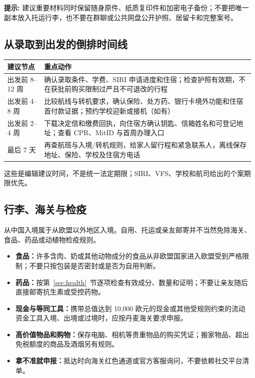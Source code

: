 \begin{grayleftbox}\textbf{提示: }
建议重要材料同时保留随身原件、纸质复印件和加密电子备份；不要把唯一副本放入托运行李，也不要在群聊或公共网盘公开护照、居留卡和完整案号。
\end{grayleftbox}

\subsection{从录取到出发的倒排时间线}

\noindent\begin{tabularx}{\textwidth}{@{}p{}X@{}}
\toprule
\textbf{建议节点} & \textbf{重点动作} \\
\midrule
出发前 8--12 周 & 确认录取条件、学费、SIRI 申请进度和住宿；检查护照有效期，不在获批前购买限制过严且不可退改的行程 \\
出发前 4--8 周 & 比较航线与转机要求，确认保险、处方药、银行卡境外功能和住宿首付款证据；预约学校迎新或接机（如有） \\
出发前 2--4 周 & 下载决定信和缴费回执，向住宿方确认钥匙、信箱姓名和可登记地址；查看 CPR、MitID 与首周办理入口 \\
最后 7 天 & 再查航班与入境/转机规则，给家人留行程和紧急联系人，离线保存地址、保险、学校及住宿方电话 \\
\bottomrule
\end{tabularx}

这些是编辑建议时间，不是统一法定期限；SIRI、VFS、学校和航司给出的个案期限优先。

\subsection{行李、海关与检疫}

从中国入境属于从欧盟以外地区入境。自用、托运或亲友邮寄并不当然免除海关、食品、药品或动植物检疫规则。

\begin{itemize}[leftmargin=2em,itemsep=3pt]
  \item \textbf{食品：}许多含肉、奶或其他动物成分的食品从非欧盟国家进入欧盟受到严格限制；不要只按包装是否密封或是否为自用判断。
  \item \textbf{药品：}按第~\ref{sec:health}~节逐项检查有效成分、数量和证明；不要让亲友随后直接邮寄抗生素或受控药物。
  \item \textbf{现金与等同工具：}携带总值达到 10,000 欧元的现金或其他受规则约束的流动资金工具入境、出境或过境时，应按丹麦海关要求申报。
  \item \textbf{高价值物品和购物：}保存电脑、相机等贵重物品的购买凭证；搬家物品、超出免税额度的商品及酒烟另有规则。
  \item \textbf{拿不准就申报：}抵达时向海关红色通道或官方客服询问，不要依赖社交平台清单。
\end{itemize}

